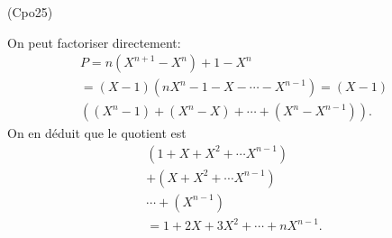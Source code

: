 \begin{tiny}(Cpo25)\end{tiny} On peut factoriser directement:
\begin{multline*}
  P = n(X^{n+1} - X^n) + 1 - X^n \\
  =(X-1)\left(nX^n - 1 - X - \cdots - X^{n-1} \right)
  =(X-1)\\\left((X^n - 1) + (X^n - X) + \cdots  +(X^n- X^{n-1}) \right).
\end{multline*}
On en déduit que le quotient est
\begin{multline*}
  (1 + X + X^2 + \cdots X^{n-1})\\
  + (X + X^2 + \cdots X^{n-1})\\
  \cdots + (X^{n-1}) \\
  = 1 + 2X + 3X^2 + \cdots + nX^{n-1}.
\end{multline*}
